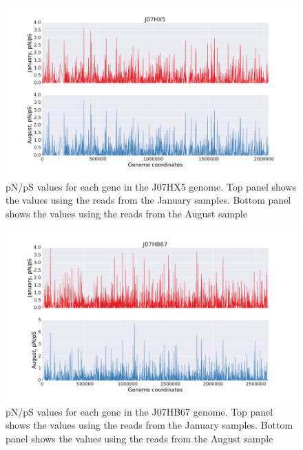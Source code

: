 \begin{figure}[p]
  \centering
  \includegraphics[width=\textwidth,height=\textheight,keepaspectratio]{Chapter5/Figures/pn_ps_plots/J07HX5_pNpS_density.pdf}
  \caption{pN/pS values for each gene in the J07HX5 genome. Top panel shows the values using the reads from the January samples. Bottom panel shows the values using the reads from the August sample}
  \label{J07HX5_pNpS}
\end{figure}

\begin{figure}[p]
  \centering
  \includegraphics[width=\textwidth,height=\textheight,keepaspectratio]{Chapter5/Figures/pn_ps_plots/J07HB67_pNpS_density.pdf}
  \caption{pN/pS values for each gene in the J07HB67 genome. Top panel shows the values using the reads from the January samples. Bottom panel shows the values using the reads from the August sample}
  \label{J07HB67_pNpS}
\end{figure}

